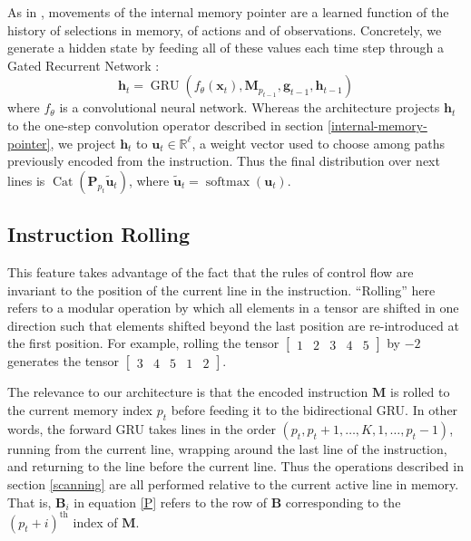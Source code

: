 \documentclass{article}
\DeclareMathOperator{\GRU}{GRU}
\DeclareMathOperator{\Cat}{Cat}
\DeclareMathOperator{\softmax}{softmax}
\begin{document}
As in \cite{oh2017zero}, movements of the internal memory pointer are a learned
function of the history of selections in memory, of actions and of observations.
Concretely, we generate a hidden state by feeding all of these values each time
step through a Gated Recurrent Network \cite{ChoMGBSB14}:
\begin{equation}
  \mathbf{h}_t = \GRU\left(f_\theta\left(\mathbf{x}_t\right),
    \mathbf{M}_{p_{t-1}}, \mathbf{g}_{t-1},
  \mathbf{h}_{t-1}\right)
\end{equation}
where $f_\theta$ is a convolutional neural network. Whereas the
\cite{oh2017zero} architecture
projects $\mathbf{h}_{t}$ to the one-step convolution operator described in
section \ref{internal-memory-pointer}, we project $\mathbf{h}_t$ to $\mathbf{u}_t\in \mathbb{R}^\ell$, a weight vector
used to choose among paths previously encoded from the instruction. Thus the final
distribution over next lines is
$\Cat(\mathbf{P}_{p_t}\tilde{\mathbf{u}}_t)$, where $\tilde{\mathbf{u}}_t =
\softmax\left(\mathbf{u}_t\right)$.


\subsection{Instruction Rolling}
\label{rolling}
This feature takes advantage of the fact that the rules of control flow are
invariant to the position of the current line in the instruction. ``Rolling'' here
refers to a modular operation by which all elements in a tensor are shifted in
one direction such that elements shifted beyond the last position are
re-introduced at the first position. For example, rolling the tensor 
$\begin{bmatrix} 1 & 2 & 3 & 4 & 5 \end{bmatrix}$ by $-2$ generates the tensor
$\begin{bmatrix} 3 & 4 & 5 & 1 & 2 \end{bmatrix}$. 

The relevance to our architecture is that the encoded instruction $\mathbf{M}$ is rolled to the current memory index
$p_t$ before feeding it to the bidirectional GRU. In other words, the forward GRU takes lines in the
order $(p_t, p_t + 1, \dots, K, 1, \dots, p_t - 1)$, running from the current
line, wrapping around the last line of the instruction, and returning to the line
before the current line. Thus the operations described in section \ref{scanning} are all performed
relative to the current active line in memory. That is, $\mathbf{B}_{i}$ in
equation \ref{P} refers to the row of $\mathbf{B}$ corresponding to the $(p_t +
i)^{\text{th}}$ index of $\mathbf{M}$.
\end{document}
